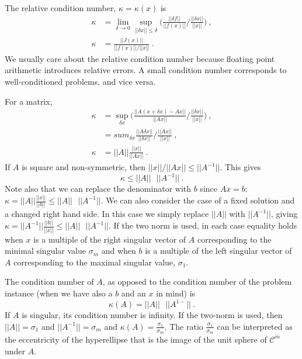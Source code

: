 \documentclass[12pt,twoside]{book}
\begin{document}
The relative condition number, $\kappa = \kappa(x)$ is 
%
\begin{align}
  \kappa &= \lim_{\delta \rightarrow 0} \sup_{||\delta x|| \le \delta} \biggl(\frac{||\delta f||}{||f(x)||} / \frac{||\delta x||}{||x||} \biggr)  \:, \\
  \kappa &= \frac{||J(x)||}{||f(x)|| / ||x||} \:.
\end{align}
We usually care about the relative condition number because floating point arithmetic introduces relative errors. A small condition number corresponds to well-conditioned problems, and vice versa.

For a matrix, 
\begin{align}
  \kappa &= \sup_{\delta x} \biggl(\frac{||A(x + \delta x) - Ax||}{||Ax||} / \frac{||\delta x||}{||x||} \biggr) \:, \\
  &= sum_{\delta x} \frac{||A \delta x||}{||\delta x||} / \frac{||Ax||}{||x||} \:, \\
  \kappa &= ||A||\frac{||x||}{||Ax||} \:.
\end{align}
%
If $A$ is square and non-symmetric, then $||x||/||Ax|| \le ||A^{-1}||$. This gives
%
\begin{equation}
  \kappa \le ||A|| \text{ }||A^{-1}|| \:.
\end{equation}
%
Note also that we can replace the denominator with $b$ since $Ax = b$: $\kappa = ||A|| \frac{||x||}{||b||} \le ||A||\text{ } ||A^{-1}||$. We can also consider the case of a fixed solution and a changed right hand side. In this case we simply replace $||A||$ with $||A^{-1}||$, giving $\kappa = ||A^{-1}|| \frac{||b||}{||x||} \le ||A|| \text{ }||A^{-1}||$. If the two norm is used, in each case equality holds when $x$ is a multiple of the right singular vector of $A$ corresponding to the minimal singular value $\sigma_{m}$ and when $b$ is a multiple of the left singular vector of $A$ corresponding to the maximal singular value, $\sigma_{1}$.

The condition number of $A$, as opposed to the condition number of the problem instance (when we have also a $b$ and an $x$ in mind) is
\begin{equation}
  \kappa(A) = ||A|| \text{ }||A^{1-}|| \:.
\end{equation}
%
If $A$ is singular, its condition number is infinity. If the two-norm is used, then $||A|| = \sigma_{1}$ and $||A^{-1}|| = \sigma_{m}$ and $\kappa(A) = \frac{\sigma_{1}}{\sigma_{m}}$. The ratio $\frac{\sigma_{1}}{\sigma_{m}}$ can be interpreted as the eccentricity of the hyperellipse that is the image of the unit sphere of $\mathcal{C}^{m}$ under $A$.
\end{document}
